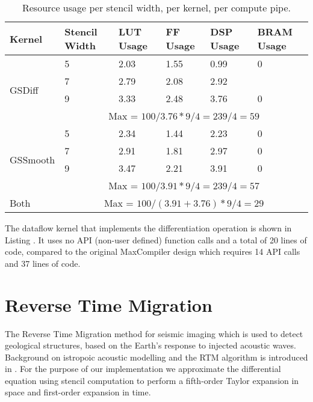 \begin{table}[ht!]
  \begin{tabularx}{\textwidth}{X|X|X|X|X|X}
    Kernel                    & Stencil Width & LUT Usage & FF Usage & DSP Usage & BRAM Usage   \\
    \hline\hline
    \multirow{4}{*}{GSDiff}   & 5             & 2.03      & 1.55     & 0.99      & 0            \\
    & 7             & 2.79      & 2.08     & 2.92      &              \\
    & 9             & 3.33      & 2.48     & 3.76      & 0            \\
    \cline{2-6}
    & \multicolumn{5}{c}{Max = $100 / 3.76 * 9 / 4 = 239 / 4 = 59 $} \\
    \hline
    \multirow{4}{*}{GSSmooth} & 5             & 2.34      & 1.44     & 2.23      & 0            \\
    & 7             & 2.91      & 1.81     & 2.97      & 0            \\
    & 9             & 3.47      & 2.21     & 3.91      & 0            \\
    \cline{2-6}
    & \multicolumn{5}{c}{Max = $100 / 3.91 * 9 / 4 = 239 / 4 = 57 $} \\
    \hline
    Both                       & \multicolumn{5}{c}{Max = $100 / (3.91 + 3.76) * 9 / 4 = 29 $}  \\
  \end{tabularx}
  \caption{Resource usage per stencil width, per kernel, per compute pipe.}
  \label{table:nd2}
\end{table}


The \FAST{} dataflow kernel that implements the differentiation
operation is shown in Listing {}. It uses no API (non-user defined)
function calls and a total of 20 lines of code, compared to the
original MaxCompiler design which requires 14 API calls and 37 lines
of code.



\section{Reverse Time Migration}
\label{sec:RTM}
The Reverse Time Migration method for seismic imaging which is used to
detect geological structures, based on the Earth's response to
injected acoustic waves. Background on istropoic acoustic modelling
and the RTM algorithm is introduced in . For the
purpose of our implementation we approximate the differential equation
using stencil computation to perform a fifth-order Taylor expansion in
space and first-order expansion in time.

